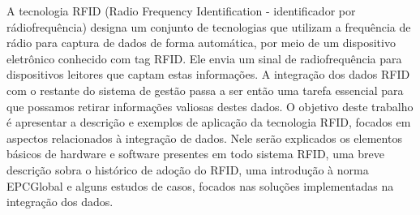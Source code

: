 

A tecnologia RFID (Radio Frequency Identification - identificador por rádiofrequência) designa um conjunto de tecnologias que utilizam a frequência de rádio para captura de dados de forma automática, por meio de um dispositivo eletrônico conhecido com tag RFID. Ele envia um sinal de radiofrequência para dispositivos leitores que captam estas informações. A integração dos dados RFID com o restante do sistema de gestão passa a ser então uma tarefa essencial para que possamos retirar informações valiosas destes dados. O objetivo deste trabalho é apresentar a descrição e exemplos de aplicação da tecnologia RFID, focados em aspectos relacionados à integração de dados. Nele serão explicados os elementos básicos de hardware e software presentes em todo sistema RFID, uma breve descrição sobra o histórico de adoção do RFID, uma introdução à norma EPCGlobal e alguns estudos de casos, focados nas soluções implementadas na integração dos dados.



